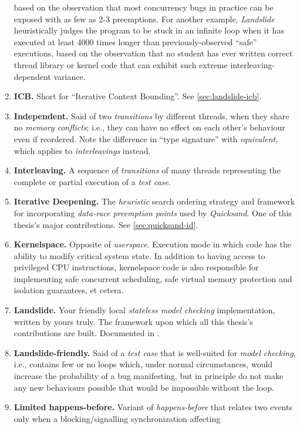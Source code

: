 \begin{enumerate}
		based on the observation that most concurrency bugs in practice can be exposed with as few as 2-3 preemptions.
		For another example, {\em Landslide} heuristically judges the program to be stuck in an infinite loop
		when it has executed at least 4000 times longer than previously-observed ``safe'' executions,
		based on the observation that no student has ever written correct thread library or kernel code
		that can exhibit such extreme interleaving-dependent variance.
	\item {\bf ICB.} Short for ``Iterative Context Bounding''. See \cref{sec:landslide-icb}.
	\item {\bf Independent.}
		Said of two {\em transitions} by different threads,
		when they share no {\em memory conflicts};
		i.e., they can have no effect on each other's behaviour even if reordered.
		Note the difference in ``type signature'' with {\em equivalent}, which applies to {\em interleavings} instead.
	\item {\bf Interleaving.}
		A sequence of {\em transitions} of many threads representing the complete or partial execution
		of a {\em test case}.
	\item {\bf Iterative Deepening.}
		The {\em heuristic} search ordering strategy and framework for incorporating {\em data-race preemption points}
		used by {\em Quicksand}.
		One of this thesis's major contributions.
		See \cref{sec:quicksand-id}.
	\item {\bf Kernelspace.}
		Opposite of {\em userspace}.
		Execution mode in which code has the ability to modify critical system state.
		In addition to having access to privileged CPU instructions,
		kernelspace code is also responsible for implementing safe
		concurrent scheduling, safe virtual memory protection and isolation guarantees, et cetera.
	\item {\bf Landslide.}
		Your friendly local {\em stateless model checking} implementation, written by yours truly.
		The framework upon which all this thesis's contributions are built.
		Documented in .
	\item {\bf Landslide-friendly.}
		Said of a {\em test case} that is well-suited for {\em model checking},
		i.e.,
		contains few or no loops which,
		under normal circumstances, would increase the probability of a bug manifesting,
		but in principle do not make any new behaviours possible that would be impossible without the loop.
	\item {\bf Limited happens-before.}
		Variant of {\em happens-before} that relates two events only when a blocking/signalling synchronization affecting

\end{enumerate}
